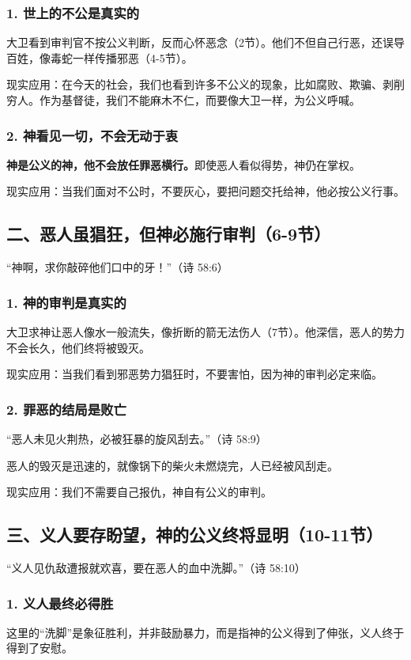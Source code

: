 \documentclass[a4paper, 12pt]{article}
\begin{document}
\subsubsection*{1. 世上的不公是真实的}
\hspace{0.6cm}大卫看到审判官不按公义判断，反而心怀恶念（2节）。他们不但自己行恶，还误导百姓，像毒蛇一样传播邪恶（4-5节）。

现实应用：在今天的社会，我们也看到许多不公义的现象，比如腐败、欺骗、剥削穷人。作为基督徒，我们不能麻木不仁，而要像大卫一样，为公义呼喊。
\subsubsection*{2. 神看见一切，不会无动于衷}
\hspace{0.6cm}\textbf{神是公义的神，他不会放任罪恶横行。}即使恶人看似得势，神仍在掌权。

现实应用：当我们面对不公时，不要灰心，要把问题交托给神，他必按公义行事。
\subsection*{二、恶人虽猖狂，但神必施行审判（6-9节）}
“神啊，求你敲碎他们口中的牙！”（诗 58:6）

\subsubsection*{1. 神的审判是真实的}
\hspace{0.6cm}大卫求神让恶人像水一般流失，像折断的箭无法伤人（7节）。他深信，恶人的势力不会长久，他们终将被毁灭。

现实应用：当我们看到邪恶势力猖狂时，不要害怕，因为神的审判必定来临。
\subsubsection*{2. 罪恶的结局是败亡}
“恶人未见火荆热，必被狂暴的旋风刮去。”（诗 58:9）

恶人的毁灭是迅速的，就像锅下的柴火未燃烧完，人已经被风刮走。

现实应用：我们不需要自己报仇，神自有公义的审判。
\subsection*{三、义人要存盼望，神的公义终将显明（10-11节）}
“义人见仇敌遭报就欢喜，要在恶人的血中洗脚。”（诗 58:10）

\subsubsection*{1. 义人最终必得胜}
\hspace{0.6cm}这里的“洗脚”是象征胜利，并非鼓励暴力，而是指神的公义得到了伸张，义人终于得到了安慰。
\end{document}
